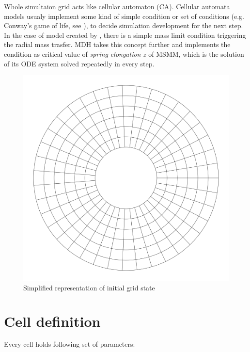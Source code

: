 Whole simultaion grid acts like cellular automaton (CA). Cellular automata models usualy implement some kind of simple condition or set of conditions (e.g. Conway's game of life, see \cite{gardner1970}), to decide simulation development for the next step. In the case of model created by \cite{yonehara1997}, there is a simple mass limit condition triggering the radial mass trasfer. MDH takes this concept further and implements the condition as critical value of \emph{spring elongation} $z$ of MSMM, which is the solution of its ODE system solved repeatedly in every step. 

\begin{figure}
\centering
\includegraphics[width=0.9\columnwidth]{img/initial_grid_state.png}
\caption{Simplified representation of initial grid state}
\label{fig:initial_grid_state}
\end{figure}

\section{Cell definition}
Every cell holds following set of parameters:

